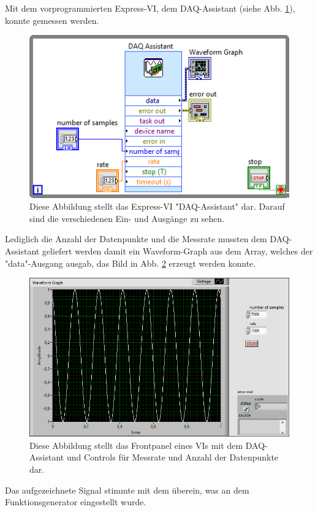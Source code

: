 		Mit dem vorprogrammierten Express-VI, dem DAQ-Assistant (siehe Abb. \ref{fig:daq}), konnte gemessen werden.
		\begin{figure}[ht]
			\centering
			\includegraphics[width=\textwidth]{pic/daq.png}
			\caption{Diese Abbildung stellt das Express-VI "DAQ-Assistant" dar. Darauf sind die verschiedenen Ein- und Ausgänge zu sehen.}
			\label{fig:daq}	
		\end{figure}
		Lediglich die Anzahl der Datenpunkte und die Messrate mussten dem DAQ-Assistant geliefert werden damit ein Waveform-Graph aus dem Array, welches der "data"-Ausgang ausgab, das Bild in Abb. \ref{fig:daq_sig} erzeugt werden konnte. 
		\begin{figure}[h]
			\centering
			\includegraphics[width=\textwidth]{pic/daq_sig.png}
			\caption{Diese Abbildung stellt das Frontpanel eines VIs mit dem DAQ-Assistant und Controls für Messrate und Anzahl der Datenpunkte dar.}
			\label{fig:daq_sig}	
		\end{figure}
		Das aufgezeichnete Signal stimmte mit dem überein, was an dem Funktionsgenerator eingestellt wurde.
	
